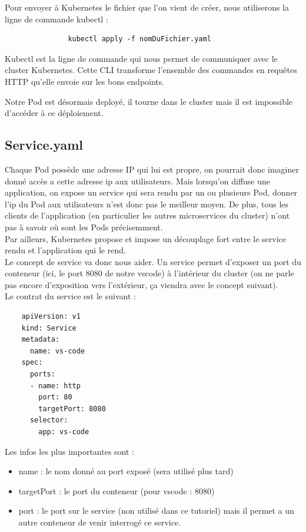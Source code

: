 \documentclass[11pt,fleqn]{book} %
\begin{document}
Pour envoyer à Kubernetes le fichier que l'on vient de créer, nous utiliserons la ligne de commande kubectl :
\begin{verbatim}
               kubectl apply -f nomDuFichier.yaml
\end{verbatim}
Kubectl est la ligne de commande qui nous permet de communiquer avec le cluster Kubernetes. Cette CLI transforme l'ensemble des commandes en requêtes HTTP qu'elle envoie sur les bons endpoints.\newline

Notre Pod est désormais deployé, il tourne dans le cluster mais il est impossible d'accéder à ce déploiement.
\subsection*{Service.yaml}
Chaque Pod possède une adresse IP qui lui est propre, on pourrait donc imaginer donné accès a cette adresse ip aux utilisateurs. Mais lorsqu'on diffuse une application, on expose un service qui sera rendu par un ou plusieurs Pod, donner l'ip du Pod aux utilisateurs n'est donc pas le meilleur moyen. De plus, tous les clients de l'application (en particulier les autres microservices du cluster) n'ont pas à savoir où sont les Pods précisemment. \\

Par ailleurs, Kubernetes propose et impose un découplage fort entre le service rendu et l'application qui le rend. \\ 

Le concept de service va donc nous aider. Un service permet d'exposer un port du conteneur (ici, le port 8080 de notre vscode) à l'intérieur du cluster (on ne parle pas encore d'exposition vers l'extérieur, ça viendra avec le concept suivant). \\
Le contrat du service est le suivant : 
\begin{verbatim}
    apiVersion: v1
    kind: Service
    metadata:
      name: vs-code
    spec:
      ports:
      - name: http
        port: 80
        targetPort: 8080
      selector:
        app: vs-code
\end{verbatim}
Les infos les plus importantes sont : 
\begin{itemize}
    \item name : le nom donné au port exposé (sera utilisé plus tard)
    \item targetPort : le port du conteneur (pour vscode : 8080)
    \item port : le port sur le service (non utilisé dans ce tutoriel) mais il permet a un autre conteneur de venir interrogé ce service.\\
\end{itemize}
\end{document}
